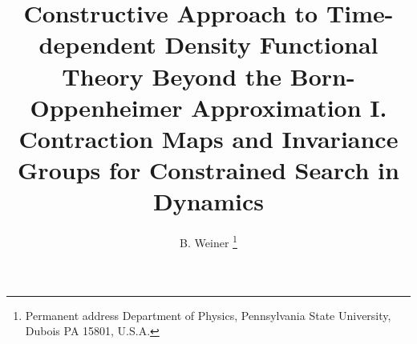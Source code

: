 %






\epsfverbosetrue 
\newcommand{\be}{\begin{equation}}
\newcommand{\ee}{\end{equation}}
\newcommand{\bea}{\begin{eqnarray}}
\newcommand{\eea}{\end{eqnarray}}
\newcommand{\ba}{\begin{array}}
\newcommand{\ea}{\end{array}}
\newcommand{\half}{1/2}
\newcommand{\pprime}{\prime \prime}
\newcommand{\ppprime}{\prime \prime \prime}
\def\rank{\mathop{\rm rank}\nolimits}



\title{Constructive Approach to Time-dependent Density Functional Theory
Beyond the Born-Oppenheimer Approximation I. Contraction Maps and Invariance
Groups for Constrained Search in Dynamics}
\author{B. Weiner \thanks{%
Permanent address Department of Physics, Pennsylvania State University,
Dubois PA 15801, U.S.A.}}
\address{and \\
S.B. Trickey \\
Quantum Theory Project \\
Department of Physics \\
University of Florida \\
Gainesville, FL 32611-8435, U.S.A.\\
May 6, 2001}
\maketitle

